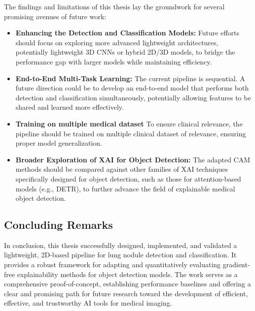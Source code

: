 The findings and limitations of this thesis lay the groundwork for several promising avenues of future work:
\begin{itemize}
    \item \textbf{Enhancing the Detection and Classification Models:} Future efforts should focus on exploring more advanced lightweight architectures, potentially lightweight 3D CNNs or hybrid 2D/3D models, to bridge the performance gap with larger models while maintaining efficiency.

    \item \textbf{End-to-End Multi-Task Learning:} The current pipeline is sequential. A future direction could be to develop an end-to-end model that performs both detection and classification simultaneously, potentially allowing features to be shared and learned more effectively.

    \item \textbf{Training on multiple medical dataset} To ensure clinical relevance, the pipeline should be trained on multiple clinical dataset of relevance, ensuring proper model generalization.
    
    \item \textbf{Broader Exploration of XAI for Object Detection:} The adapted CAM methods should be compared against other families of XAI techniques specifically designed for object detection, such as those for attention-based models (e.g., DETR), to further advance the field of explainable medical object detection.
\end{itemize}

\subsection{Concluding Remarks}
\label{sec:concluding_remarks}

In conclusion, this thesis successfully designed, implemented, and validated a lightweight, 2D-based pipeline for lung nodule detection and classification. It provides a robust framework for adapting and quantitatively evaluating gradient-free explainability methods for object detection models. The work serves as a comprehensive proof-of-concept, establishing performance baselines and offering a clear and promising path for future research toward the development of efficient, effective, and trustworthy AI tools for medical imaging.

